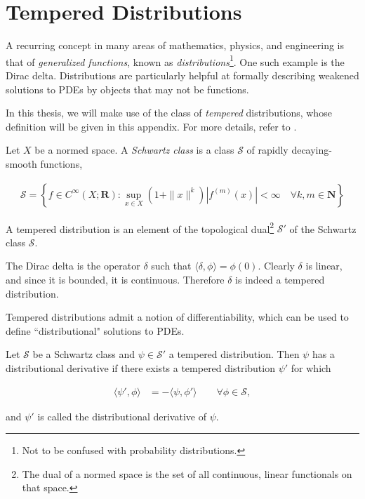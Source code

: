\chapter{Tempered Distributions}
A recurring concept in many areas of mathematics, physics, and engineering is
that of \emph{generalized functions}, known as \emph{distributions}\footnote{Not
  to be confused with probability distributions.}. One such example is the Dirac
  delta. Distributions are particularly helpful at formally describing weakened solutions
  to PDEs by objects that may not be functions.

In this thesis, we will make use of the class of \emph{tempered} distributions,
whose definition will be given in this appendix. For more details, refer to
\citet{lax2002functional}.

\begin{definition}
  Let $X$ be a normed space. A \emph{Schwartz class} is a class $\mathcal{S}$ of rapidly decaying-smooth
  functions,

  \begin{align*}
    \mathcal{S} = \left\{f\in C^\infty(X; \mathbf{R}) : \sup_{x\in X}(1 +
    \|x\|^k)|f^{(m)}(x)|<\infty\quad\forall k,m\in\mathbf{N}\right\}
  \end{align*}
\end{definition}

\begin{definition}\label{def:tempered-distribution}
  A tempered distribution is an element of the topological dual\footnote{The
    dual of a normed space is the set of all continuous, linear functionals on
    that space.} $\mathcal{S}'$
  of the Schwartz class $\mathcal{S}$.
\end{definition}

\begin{remark}
  The Dirac delta is the operator $\delta$ such that $\langle\delta, \phi\rangle
  = \phi(0)$. Clearly $\delta$ is linear, and since it is bounded,
  it is continuous. Therefore $\delta$ is indeed a tempered distribution.
\end{remark}

Tempered distributions admit a notion of differentiability, which can be used to
define ``distributional" solutions to PDEs.

\begin{definition}\label{def:distributional-derivative}
  Let $\mathcal{S}$ be a Schwartz class and $\psi\in\mathcal{S}'$ a tempered
  distribution. Then $\psi$ has a distributional derivative if there exists a
  tempered distribution $\psi'$ for which

  \begin{align*}
    \langle \psi', \phi\rangle &= -\langle\psi,
    \phi'\rangle\qquad\forall\phi\in\mathcal{S},
  \end{align*}

  and $\psi'$ is called the distributional derivative of $\psi$.
\end{definition}

